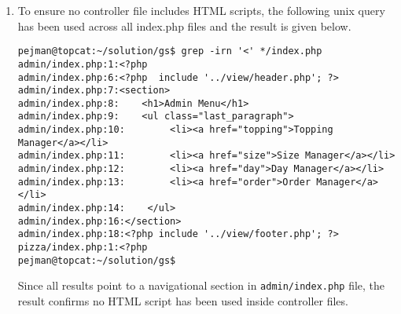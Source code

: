 \begin{enumerate}[label=(\alph*)]
\item To ensure no controller file includes HTML scripts, the following unix query has been used across all index.php files and the result is given below.
\lstset{language=bash}
\begin{lstlisting}
pejman@topcat:~/solution/gs$ grep -irn '<' */index.php                          admin/index.php:1:<?php
admin/index.php:6:<?php  include '../view/header.php'; ?>
admin/index.php:7:<section>
admin/index.php:8:    <h1>Admin Menu</h1>
admin/index.php:9:    <ul class="last_paragraph">
admin/index.php:10:        <li><a href="topping">Topping Manager</a></li>
admin/index.php:11:        <li><a href="size">Size Manager</a></li>
admin/index.php:12:        <li><a href="day">Day Manager</a></li>
admin/index.php:13:        <li><a href="order">Order Manager</a></li>
admin/index.php:14:    </ul>
admin/index.php:16:</section>
admin/index.php:18:<?php include '../view/footer.php'; ?>
pizza/index.php:1:<?php
pejman@topcat:~/solution/gs$
\end{lstlisting}
Since all results point to a navigational section in \texttt{admin/index.php} file, the result confirms no HTML script has been used inside controller files.


\end{enumerate}

